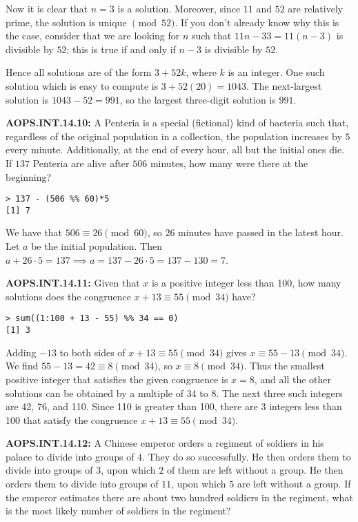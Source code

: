 \documentclass[11pt]{article}
\newenvironment{uzdevums}[1][\unskip]{%
\vspace{3mm}
\noindent
\textbf{#1:}
\noindent}
{}
\begin{document}
Now it is clear that $n=3$ is a solution. Moreover, since $11$ and $52$ are relatively prime, the solution is unique $\pmod{52}$. If you don't already know why this is the case, consider that we are looking for $n$ such that $11n-33=11(n-3)$ is divisible by $52$; this is true if and only if $n-3$ is divisible by $52$.

Hence all solutions are of the form $3+52k$, where $k$ is an integer. One such solution which is easy to compute is $3+52(20) = 1043$. The next-largest solution is $1043-52 = 991$, so the largest three-digit solution is $\boxed{991}$.


\begin{uzdevums}[AOPS.INT.14.10]
A Penteria is a special (fictional) kind of bacteria such that, regardless of the original population in a collection, the population increases by $5$ every minute. Additionally, at the end of every hour, all but the initial ones die. If $137$ Penteria are alive after $506$ minutes, how many were there at the beginning?
\end{uzdevums}

\begin{verbatim}
> 137 - (506 %% 60)*5
[1] 7
\end{verbatim}

We have that $506\equiv 26\pmod {60}$, so $26$ minutes have passed in the latest hour. Let $a$ be the initial population. Then $a+26\cdot 5=137\implies a=137-26\cdot 5=137-130=\boxed{7}$.

\begin{uzdevums}[AOPS.INT.14.11]
Given that $x$ is a positive integer less than 100, how many solutions does the congruence $x + 13 \equiv 55 \pmod{34}$ have?
\end{uzdevums}

\begin{verbatim}
> sum((1:100 + 13 - 55) %% 34 == 0)
[1] 3
\end{verbatim}

Adding $-13$ to both sides of $x + 13 \equiv 55 \pmod{34}$ gives $x \equiv 55-13 \pmod{34}$. We find $55-13 = 42 \equiv 8 \pmod{34}$, so $x \equiv 8 \pmod{34}$. Thus the smallest positive integer that satisfies the given congruence is $x = 8$, and all the other solutions can be obtained by a multiple of 34 to 8. The next three such integers are 42, 76, and 110. Since 110 is greater than 100, there are $\boxed{3}$ integers less than 100 that satisfy the congruence $x + 13 \equiv 55 \pmod{34}$.

\begin{uzdevums}[AOPS.INT.14.12]
A Chinese emperor orders a regiment of soldiers in his palace to divide into groups of $4$. They do so successfully. He then orders them to divide into groups of $3$, upon which $2$ of them are left without a group. He then orders them to divide into groups of $11$, upon which $5$ are left without a group. If the emperor estimates there are about two hundred soldiers in the regiment, what is the most likely number of soldiers in the regiment?
\end{uzdevums}
\end{document}
